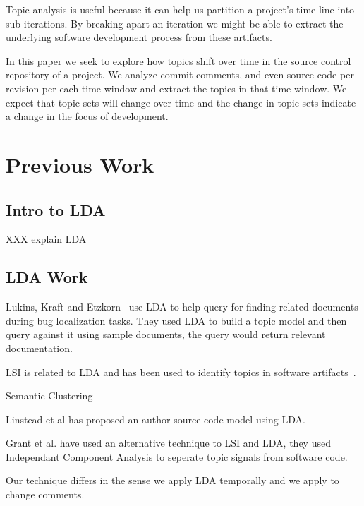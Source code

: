 \documentclass{report}
\begin{document}

Topic analysis is useful because it can help us partition a project's
time-line into sub-iterations. By breaking apart an iteration we might
be able to extract the underlying software development process from
these artifacts.

In this paper we seek to explore how topics shift over time in
the source control repository of a project. We analyze commit
comments, and even source code per revision per each time window and
extract the topics in that time window. We expect that topic sets
will change over time and the change in topic sets indicate a change
in the focus of development. 

\section{Previous Work}

\subsection{Intro to LDA}

XXX explain LDA \cite{944937}

\subsection{LDA Work}

Lukins, Kraft and Etzkorn~\cite{lukins2008} use LDA to help query for
finding related documents during bug localization tasks. They used LDA
to build a topic model and then query against it using sample
documents, the query would return relevant documentation.

LSI is related to LDA and has been used to identify topics in software
artifacts~\cite{1421013,1374321,10.1109/ICPC.2007.13,10.1109/ICPC.2006.17}.

Semantic Clustering \cite{1698774,1566153}

Linstead et al has proposed an author source code model using
LDA.\cite{10.1109/MSR.2007.20,NIPS2007637,1321709} 

Grant et al. have used an alternative technique to LSI and LDA, they
used Independant Component Analysis to seperate topic signals from
software code.

Our technique differs in the sense we apply LDA temporally and we
apply to change comments.
\end{document}
